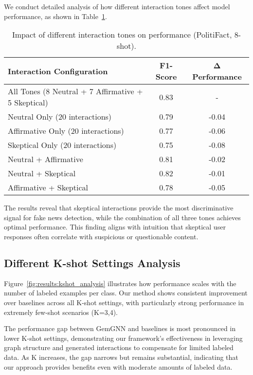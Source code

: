We conduct detailed analysis of how different interaction tones affect model performance, as shown in Table~\ref{tab:ablation:tones}.

\begin{table}[htbp]
\centering
\caption{Impact of different interaction tones on performance (PolitiFact, 8-shot).}
\label{tab:ablation:tones}
\begin{tabular}{lcc}
\toprule
\textbf{Interaction Configuration} & \textbf{F1-Score} & \textbf{Δ Performance} \\
\midrule
All Tones (8 Neutral + 7 Affirmative + 5 Skeptical) & 0.83 & - \\
\midrule
Neutral Only (20 interactions) & 0.79 & -0.04 \\
Affirmative Only (20 interactions) & 0.77 & -0.06 \\
Skeptical Only (20 interactions) & 0.75 & -0.08 \\
\midrule
Neutral + Affirmative & 0.81 & -0.02 \\
Neutral + Skeptical & 0.82 & -0.01 \\
Affirmative + Skeptical & 0.78 & -0.05 \\
\bottomrule
\end{tabular}
\end{table}

The results reveal that skeptical interactions provide the most discriminative signal for fake news detection, while the combination of all three tones achieves optimal performance. This finding aligns with intuition that skeptical user responses often correlate with suspicious or questionable content.

\subsection{Different K-shot Settings Analysis}

Figure~\ref{fig:results:kshot_analysis} illustrates how performance scales with the number of labeled examples per class. Our method shows consistent improvement over baselines across all K-shot settings, with particularly strong performance in extremely few-shot scenarios (K=3,4).

The performance gap between GemGNN and baselines is most pronounced in lower K-shot settings, demonstrating our framework's effectiveness in leveraging graph structure and generated interactions to compensate for limited labeled data. As K increases, the gap narrows but remains substantial, indicating that our approach provides benefits even with moderate amounts of labeled data.


